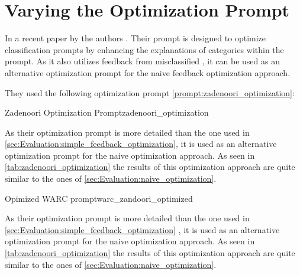 \begin{landscape}
    \begin{table}
        \centering
        \renewcommand{\arraystretch}{1}
        
        \renewcommand{\arraystretch}{1}
        \caption{Naive prompt optimization approach considering previous misclassified \TLs}
        \label{tab:placeholder}
    \end{table}
\end{landscape}


\section{Varying the Optimization Prompt}
\label{sec:Evaluation:varying-the-optimization-prompt}
In a recent paper by  the authors .
Their prompt is designed to optimize classification prompts by enhancing the explanations of categories within the prompt.
As it also utilizes feedback from misclassified \TLs, it can be used as an alternative optimization prompt for the naive feedback optimization approach.

They used the following optimization prompt \autoref{prompt:zadenoori_optimization}:
\begin{prompt}{Zadenoori Optimization Prompt}{zadenoori_optimization}
    \\
    
\end{prompt}

As their optimization prompt is more detailed than the one used in \autoref{sec:Evaluation:simple_feedback_optimization}, it is used as an alternative optimization prompt for the naive optimization approach.
As seen in \autoref{tab:zadenoori_optimization} the results of this optimization approach are quite similar to the ones of \autoref{sec:Evaluation:naive_optimization}.

\newpage
\begin{prompt}{Opimized WARC prompt}{warc_zandoori_optimized}
    \\
    
\end{prompt}

As their optimization prompt is more detailed than the one used in \autoref{sec:Evaluation:simple_feedback_optimization} , it is used as an alternative optimization prompt for the naive optimization approach.
As seen in \autoref{tab:zadenoori_optimization} the results of this optimization approach are quite similar to the ones of \autoref{sec:Evaluation:naive_optimization}.

\begin{table}
    \centering
    \renewcommand{\arraystretch}{1.4}
    
    \renewcommand{\arraystretch}{1}
    \caption{Naive prompt optimization approach using the optimization prompt by }
    \label{tab:zadenoori_optimization}
\end{table}